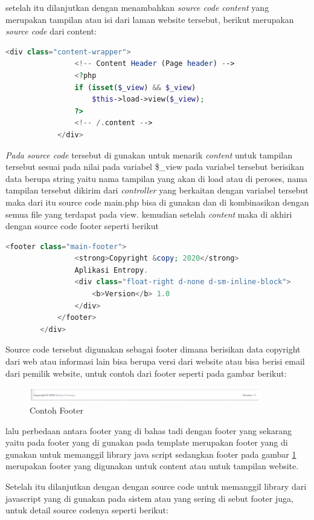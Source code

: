 setelah itu dilanjutkan dengan menambahkan \textit{source code content} yang merupakan tampilan atau  isi dari laman website tersebut,  berikut merupakan \textit{source code} dari content: 

\begin{lstlisting}[language=PHP]
	        <div class="content-wrapper">  
	            <!-- Content Header (Page header) -->  
	            <?php  
	            if (isset($_view) && $_view)  
	                $this->load->view($_view);  
	            ?>  
	            <!-- /.content -->  
	        </div>
\end{lstlisting}
\textit{Pada source code} tersebut di gunakan untuk menarik \textit{content} untuk tampilan tersebut sesuai pada nilai pada variabel \$\_view pada variabel tersebut berisikan data berupa string yaitu  nama tampilan yang akan di load atau di peroses, nama tampilan tersebut dikirim dari \textit{controller} yang berkaitan dengan variabel tersebut maka dari itu source code main.php bisa di gunakan dan di kombinasikan dengan semua file yang terdapat pada view. kemudian setelah \textit{content} maka di akhiri dengan source code footer seperti berikut\par

\begin{lstlisting}[language=PHP]
	<footer class="main-footer">  
	            <strong>Copyright &copy; 2020</strong>  
	            Aplikasi Entropy.  
	            <div class="float-right d-none d-sm-inline-block">  
	                <b>Version</b> 1.0  
	            </div>  
	        </footer>  
	    </div>  
\end{lstlisting}
Source code tersebut digunakan sebagai footer dimana berisikan data copyright dari web atau informasi lain bisa berupa versi dari website atau bisa berisi email dari pemilik website, untuk contoh dari footer seperti pada gambar berikut:\par

\begin{figure}[!htbp]
	\centerline{\includegraphics[width=0.90\textwidth]{figures/view/4.png}}
	\caption{Contoh Footer}
	\label{ve4}
\end{figure}

lalu perbedaan antara footer yang di bahas tadi dengan footer yang sekarang yaitu pada footer yang di gunakan pada template merupakan footer yang di gunakan untuk memanggil library java script sedangkan footer pada gambar \ref{ve4} merupakan footer yang digunakan untuk content atau untuk tampilan website.\par
\pagebreak
Setelah itu dilanjutkan dengan dengan source code untuk memanggil library dari javascript yang di gunakan pada sistem atau yang sering di sebut footer juga, untuk detail source codenya seperti berikut:

